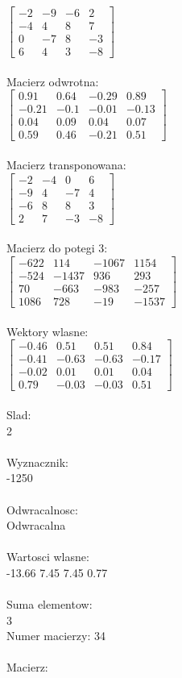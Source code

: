 \documentclass[a4paper,12pt]{article}
\begin{document}
$\begin{bmatrix} -2&-9&-6&2\\-4&4&8&7\\0&-7&8&-3\\6&4&3&-8 \end{bmatrix}$
\\
\\
Macierz odwrotna:\\

$\begin{bmatrix} 0.91&0.64&-0.29&0.89\\-0.21&-0.1&-0.01&-0.13\\0.04&0.09&0.04&0.07\\0.59&0.46&-0.21&0.51 \end{bmatrix}$
\\
\\
Macierz transponowana:\\

$\begin{bmatrix} -2&-4&0&6\\-9&4&-7&4\\-6&8&8&3\\2&7&-3&-8 \end{bmatrix}$
\\
\\
Macierz do potegi 3:\\

$\begin{bmatrix} -622&114&-1067&1154\\-524&-1437&936&293\\70&-663&-983&-257\\1086&728&-19&-1537 \end{bmatrix}$
\\
\\
Wektory wlasne:\\

$\begin{bmatrix} -0.46&0.51&0.51&0.84\\-0.41&-0.63&-0.63&-0.17\\-0.02&0.01&0.01&0.04\\0.79&-0.03&-0.03&0.51 \end{bmatrix}$
\\
\\
Slad:\\
2
\\
\\
Wyznacznik:\\
-1250
\\
\\
Odwracalnosc:\\
Odwracalna
\\
\\
Wartosci wlasne:\\
-13.66 7.45 7.45 0.77
\\
\\
Suma elementow:\\
3
\\
\newpage
Numer macierzy:
34
\\
\\
Macierz:\\
\end{document}
